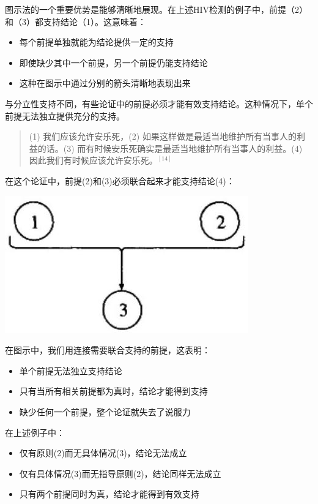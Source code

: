 图示法的一个重要优势是能够清晰地展现。在上述HIV检测的例子中，前提（2）和（3）都支持结论（1）。这意味着：
\begin{itemize}
  \item 每个前提单独就能为结论提供一定的支持
  \item 即使缺少其中一个前提，另一个前提仍能支持结论
  \item 这种在图示中通过分别的箭头清晰地表现出来
\end{itemize}

与分立性支持不同，有些论证中的前提必须才能有效支持结论。这种情况下，单个前提无法独立提供充分的支持。

\begin{examplebox}[title=联合支持的例子]
\begin{quotation}
(1) 我们应该允许安乐死，(2) 如果这样做是最适当地维护所有当事人的利益的话。(3) 而有时候安乐死确实是最适当地维护所有当事人的利益。(4) 因此我们有时候应该允许安乐死。${}^{[14]}$
\end{quotation}

在这个论证中，前提(2)和(3)必须联合起来才能支持结论(4)：
\end{examplebox}

\begin{center}
\includegraphics[width=\textwidth]{images/2025_05_15_6a28331d5e7c993ad07ag-031(1).jpg}
\end{center}

\begin{theorembox}[title=联合支持的特征]
在图示中，我们用连接需要联合支持的前提，这表明：
\begin{itemize}
  \item 单个前提无法独立支持结论
  \item 只有当所有相关前提都为真时，结论才能得到支持
  \item 缺少任何一个前提，整个论证就失去了说服力
\end{itemize}

在上述例子中：
\begin{itemize}
  \item 仅有原则(2)而无具体情况(3)，结论无法成立
  \item 仅有具体情况(3)而无指导原则(2)，结论同样无法成立
  \item 只有两个前提同时为真，结论才能得到有效支持
\end{itemize}
\end{theorembox}

